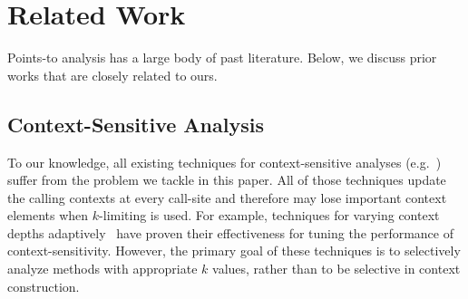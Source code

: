 \section{Related Work}\label{sec:related}

Points-to analysis has a large body of past
literature\cite{Lhotak2006,Smaragdakis2015,hind2001pointer,Lhotak2008,Might2010,
 liang1999efficient,wilson1995efficient, liang2005evaluating, chatterjee1999relevant, Whaley2004, Shivers1988,Sharir1981, Milanova2005,Milanova2002, Smaragdakis2011, kastrinis2013hybrid}. Below, we discuss prior works that are closely related to
ours.


\subsection{Context-Sensitive Analysis} To our knowledge, all
existing techniques for context-sensitive analyses
(e.g.~\cite{Sharir1981,Milanova2002,Shivers1988,
  Whaley2004,Milanova2005,Smaragdakis2011, Khedker2008,
  Karkare2007,kastrinis2013hybrid,WeiR15,Smaragdakis2014,JeJeChOh17,Oh2014,TanLX16,PadhyeK13})
suffer from the problem we tackle in this paper. All of those
techniques update the calling contexts at every call-site and
therefore may lose important context elements when $k$-limiting is used.  For example,
techniques for varying context depths
adaptively~\cite{WeiR15,JeJeChOh17,Oh2014, Smaragdakis2014} have proven
their effectiveness for tuning the performance of context-sensitivity.  However,
the primary goal of these techniques is to selectively analyze methods
with appropriate $k$ values, rather than to be selective in context
construction.


